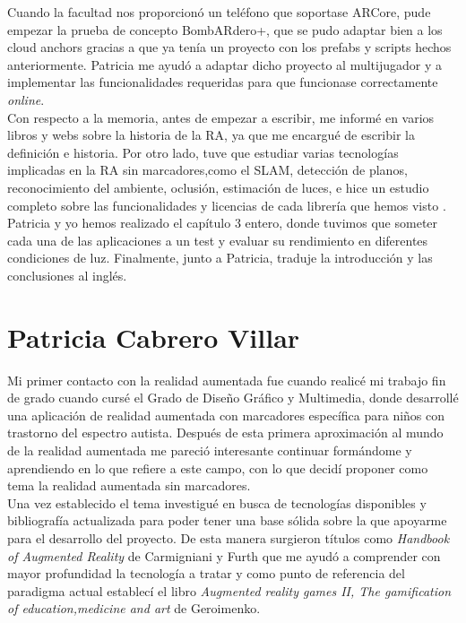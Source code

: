 Cuando la facultad nos proporcionó un teléfono que soportase ARCore, pude empezar la prueba de concepto BombARdero+, que se pudo adaptar bien a los cloud anchors gracias a que ya tenía un proyecto con los prefabs y scripts hechos anteriormente. Patricia me ayudó a adaptar dicho proyecto al multijugador y a implementar las funcionalidades requeridas para que funcionase correctamente \textit{online}.\\

Con respecto a la memoria, antes de empezar a escribir, me informé en varios libros y webs sobre la historia de la RA, ya que me encargué de escribir la definición e historia. Por otro lado, tuve que estudiar varias tecnologías implicadas en la RA sin marcadores,como el SLAM, detección de planos, reconocimiento del ambiente, oclusión, estimación de luces, e hice un estudio completo sobre las funcionalidades y licencias de cada librería que hemos visto . Patricia y yo hemos realizado el capítulo 3 entero, donde tuvimos que someter cada una de las aplicaciones a un test y evaluar su rendimiento en diferentes condiciones de luz. Finalmente, junto a Patricia, traduje la introducción y las conclusiones al inglés.
\newpage
\section{Patricia Cabrero Villar}
Mi primer contacto con la realidad aumentada fue cuando realicé mi trabajo fin de grado cuando cursé el Grado de Diseño Gráfico y Multimedia, donde desarrollé una aplicación de realidad aumentada con marcadores específica para niños con trastorno del espectro autista.
Después de esta primera aproximación al mundo de la realidad aumentada me pareció interesante continuar formándome y aprendiendo en lo que refiere a este campo, con lo que decidí proponer como tema la realidad aumentada sin marcadores.\\

Una vez establecido el tema investigué en busca de tecnologías disponibles y bibliografía actualizada para poder tener una base sólida sobre la que apoyarme para el desarrollo del proyecto. De esta manera surgieron títulos como \textit{Handbook of Augmented Reality} de Carmigniani y Furth que me ayudó a comprender con mayor profundidad la tecnología a tratar y como punto de  referencia del paradigma actual establecí el libro \textit{Augmented reality games II, The gamification of education,medicine and art} de Geroimenko.\\

